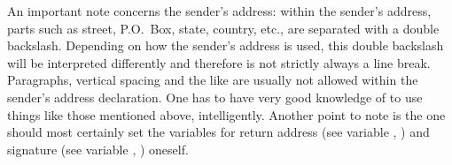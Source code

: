 An important note concerns the sender's address: within
the sender's address, parts such as street, P.O.~Box, state, country, etc.,
are separated with a double backslash. Depending on how the sender's address
is used, this double backslash will be interpreted differently and therefore
is not strictly always a line break. Paragraphs, vertical spacing and the like
are usually not allowed within the sender's address declaration. One has to
have very good knowledge of  to use things like those
mentioned above, intelligently. Another point to note is the one should most
certainly set the variables for return address (see variable
, ) and
signature (see variable ,
) oneself.%
%
%
%
%


